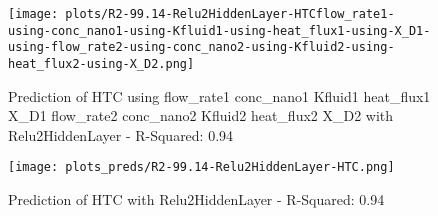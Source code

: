 
\begin{figure}[H]
    \centering
    \texttt{[image: plots/R2-99.14-Relu2HiddenLayer-HTCflow\_rate1-using-conc\_nano1-using-Kfluid1-using-heat\_flux1-using-X\_D1-using-flow\_rate2-using-conc\_nano2-using-Kfluid2-using-heat\_flux2-using-X\_D2.png]}
    \caption{Prediction of HTC using flow_rate1 conc_nano1 Kfluid1 heat_flux1 X_D1 flow_rate2 conc_nano2 Kfluid2 heat_flux2 X_D2 with Relu2HiddenLayer - R-Squared: 0.94}
\end{figure}

\begin{figure}[H]
    \centering
    \texttt{[image: plots\_preds/R2-99.14-Relu2HiddenLayer-HTC.png]}
    \caption{Prediction of HTC with Relu2HiddenLayer - R-Squared: 0.94}
\end{figure}
